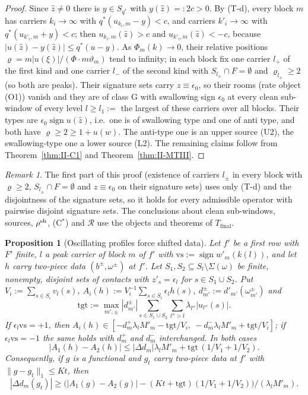 \documentclass[10pt]{amsart}
\newtheorem{proposition}[theorem]{Proposition}
\theoremstyle{definition}
\theoremstyle{remark}
\newtheorem{remark}[theorem]{Remark}
\newcommand{\sgn}{\operatorname{sign}}
\newcommand{\Rec}{\mathcal R}
\newcommand{\zh}{\hat z}
\begin{document}
\begin{proof}
Since $\zh\ne0$ there is $y\in S_{q^*}$ with $y(\zh)=:2c>0$.  By (T-d), every
block $m$ has carriers $k_i\to\infty$ with $q^*(u_{k_i,m}-y)<c$, and carriers
$k'_i\to\infty$ with $q^*(u_{k'_i,m}+y)<c$; then $u_{k_i,m}(\zh)>c$ and
$u_{k'_i,m}(\zh)<-c$, because $|u(\zh)-y(\zh)|\le q^*(u-y)$.  As $\Phi_m(k)\to
0$, their relative positions $\varrho=m|u(\xi)|/(\Phi\cdot m\vartheta_m)$ tend to
infinity; in each block fix one carrier $l_+$ of the first kind and one
carrier $l_-$ of the second kind with $S_{l_\pm}\cap F=\emptyset$ and
$\varrho_{l_\pm}\ge2$ (so both are peaks).  Their signature sets carry $z\equiv
\epsilon_0$, so their rooms (rate object (O1)) vanish and they are of class
G with swallowing sign $\epsilon_0$ at every clean sub-window of every level
$l\ge l_1:=$ the largest of these carriers over all blocks.  Their types are $\epsilon_0\sgn u(\zh)$, i.e.\
one is of swallowing type and one of anti type, and both have $\varrho\ge2\ge
1+u(w)$.  The anti-type one is an upper source (U2), the swallowing-type one
a lower source (L2).  The remaining claims follow from
Theorem~\ref{thm:II-C1} and Theorem~\ref{thm:II-MTIII}.
\end{proof}

\begin{remark}\label{rem:II-constcontact}
The first part of this proof (existence of carriers $l_\pm$ in every block
with $\varrho\ge2$, $S_{l_\pm}\cap F=\emptyset$ and $z\equiv\epsilon_0$ on
their signature sets) uses only (T-d) and the disjointness of the signature
sets, so it holds for every admissible operator with pairwise disjoint
signature sets.  The conclusions about clean sub-windows, sources,
$\rho^{\rm sh}$, (C$^*$) and $\Rec$ use the objects and theorems of
$T_{\mathrm{final}}$.
\end{remark}

\begin{proposition}[Oscillating profiles force shifted data]\label{prop:II-C4}
Let $f'$ be a first row with $F'$ finite, $l$ a peak carrier of block $m$
of $f'$ with $\mathrm{vs}:=\sgn w'_m(k(l))$, and let $h$ carry two-piece data
$(b^\pm,\omega^\pm)$ at $f'$.  Let $S_1,S_2\subseteq S_l\setminus\Sigma(\omega)$ be
finite, nonempty, disjoint sets of contacts with $z'_s=\epsilon_l$ for $s\in
S_1\cup S_2$.  Put $V_i:=\sum_{s\in S_i}v_l(s)$, $A_i(h):=V_i^{-1}\sum_{s\in
S_i}\epsilon_lh(s)$, $d^\pm_{m'}:=d'_{m'}(\omega^\pm_{m'})$ and
\[
 \mathrm{tgt}:=\max_{m',\pm}|d^\pm_{m'}|\sum_{s\in S_1\cup S_2}\sum_{l''>l}
 \lambda_{l''}|u_{l''}(s)| .
\]
If $\epsilon_l\mathrm{vs}=+1$, then $A_i(h)\in[-d^+_m\lambda_lM'_m-\mathrm{tgt}/V_i,\
-d^-_m\lambda_lM'_m+\mathrm{tgt}/V_i]$; if $\epsilon_l\mathrm{vs}=-1$ the same
holds with $d^+_m$ and $d^-_m$ interchanged.  In both cases
\[
 |A_1(h)-A_2(h)|\le|\Delta d_m|\lambda_lM'_m+\mathrm{tgt}\,(1/V_1+1/V_2).
\]
Consequently, if $g$ is a functional and $g_t$ carry two-piece data at $f'$
with $\|g-g_t\|_1\le Kt$, then
\[
 |\Delta d_m(g_t)|\ge\big(|A_1(g)-A_2(g)|-(Kt+\mathrm{tgt})(1/V_1+1/V_2)\big)/
 (\lambda_lM'_m).
\]
\end{proposition}
\end{document}
